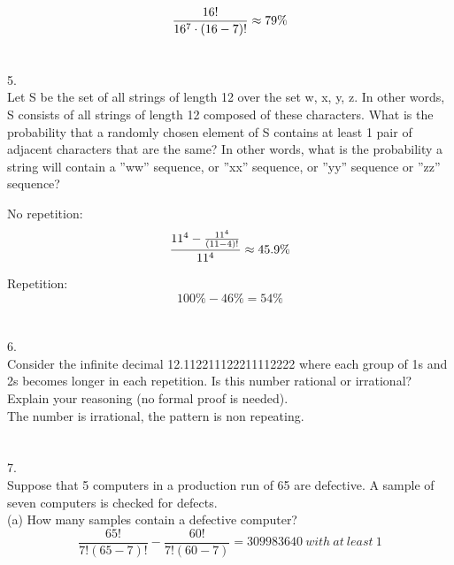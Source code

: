 \documentclass[fleqn]{article}
\begin{document}
\begin{equation*}
  \frac{16!}{16^7 \cdot (16-7)!} \approx 79\%\\
\end{equation*}


\section*{}
5.\\
Let S be the set of all strings of length 12 over the set {w, x, y, z}. 
In other words, S consists of all strings of
length 12 composed of these characters. What is the probability that 
a randomly chosen element of S contains at least 1 pair of adjacent 
characters that are the same? In other words, what is the probability a
string will contain a ”ww” sequence, or ”xx” sequence, or
”yy” sequence or ”zz” sequence?

No repetition:
\begin{equation*}
  \frac{11^4 - \frac{11^4}{(11-4)!}}{11^4} \approx 45.9\% \\
\end{equation*}

Repetition:\\

\begin{equation*}
  100\%-46\%=54\%
\end{equation*}


 \section*{}
 6. \\
Consider the infinite decimal 12.112211122211112222 where each group 
of 1s and 2s becomes longer in each repetition. Is this number rational
or irrational? Explain your reasoning (no formal proof is needed).
\\
The number is irrational, the pattern is non repeating.

\section*{}
7. \\
Suppose that 5 computers in a production run of 65 are defective. A sample of
seven computers is checked for defects.\\
(a) How many samples contain a defective computer?
\begin{equation*} 
  \frac{65!}{7!(65-7)!} - \frac{60!}{7!(60-7) }=309983640~with~at~least~1 
\end{equation*}
\end{document}
